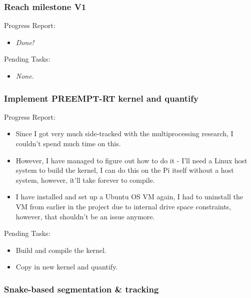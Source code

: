 \subsubsection{Reach milestone V1}

Progress Report:

\begin{itemize}
    \item \textit{Done!}
\end{itemize}

Pending Tasks:

\begin{itemize}
    \item \textit{None.}
\end{itemize}




\subsubsection{Implement PREEMPT-RT kernel and quantify}

Progress Report:

\begin{itemize}
    \item Since I got very much side-tracked with the multiprocessing research, I couldn't spend much time on this.
    \item However, I have managed to figure out how to do it - I'll need a Linux host system to build the kernel, I can do this on the Pi itself without a host system, however, it'll take forever to compile.
    \item I have installed and set up a Ubuntu OS VM again, I had to uninstall the VM from earlier in the project due to internal drive space constraints, however, that shouldn't be an issue anymore.
\end{itemize}

Pending Tasks:

\begin{itemize}
    \item Build and compile the kernel.
    \item Copy in new kernel and quantify.
\end{itemize}






\subsubsection{Snake-based segmentation \& tracking}

